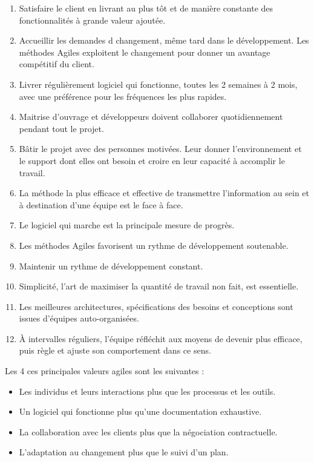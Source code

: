 \begin{enumerate}
    \item Satisfaire le client en livrant au plus tôt et de manière constante des fonctionnalités à grande valeur ajoutée.
    \item Accueillir les demandes d changement, même tard dans le développement. Les méthodes Agiles exploitent le changement pour donner un avantage compétitif du client.
    \item Livrer régulièrement logiciel qui fonctionne, toutes les 2 semaines à 2 mois, avec une préférence pour les fréquences les plus rapides.
    \item Maitrise d'ouvrage et développeurs doivent collaborer quotidiennement pendant tout le projet.
    \item Bâtir le projet avec des personnes motivées. Leur donner l'environnement et le support dont elles ont besoin et croire en leur capacité à accomplir le travail.
    \item La méthode la plus efficace et effective de transmettre l'information au sein et à destination d'une équipe est le face à face.
    \item Le logiciel qui marche est la principale mesure de progrès.
    \item Les méthodes Agiles favorisent un rythme de développement soutenable.
    \item Maintenir un rythme de développement constant.
    \item Simplicité, l’art de maximiser la quantité de travail non fait, est essentielle.
    \item Les meilleures architectures, spécifications des besoins et conceptions sont issues d'équipes auto-organisées.
    \item À intervalles réguliers, l'équipe réfléchit aux moyens de devenir plus efficace, puis règle et ajuste son comportement dans ce sens.
\end{enumerate}
Les 4 ces principales valeurs agiles sont les suivantes : 
\begin{itemize}
    \item Les individus et leurs interactions plus que les processus et les outils.
    \item Un logiciel qui fonctionne plus qu’une documentation exhaustive.
    \item La collaboration avec les clients plus que la négociation contractuelle.
    \item L’adaptation au changement plus que le suivi d’un plan.

\end{itemize}
